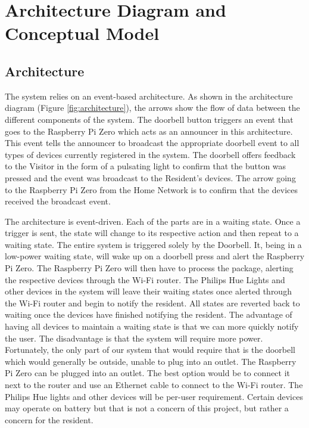 \chapter{Architecture Diagram and Conceptual Model}

\section{Architecture}
The system relies on an event-based architecture. As shown in the architecture diagram (Figure \ref{fig:architecture}), the arrows show the flow of data between the different components of the system. The doorbell button triggers an event that goes to the Raspberry Pi Zero which acts as an announcer in this architecture. This event tells the announcer to broadcast the appropriate doorbell event to all types of devices currently registered in the system. The doorbell offers feedback to the Visitor in the form of a pulsating light to confirm that the button was pressed and the event was broadcast to the Resident's devices. The arrow going to the Raspberry Pi Zero from the Home Network is to confirm that the devices received the broadcast event.

The architecture is event-driven. Each of the parts are in a waiting state. Once a trigger is sent, the state will change to its respective action and then repeat to a waiting state. The entire system is triggered solely by the Doorbell. It, being in a low-power waiting state, will wake up on a doorbell press and alert the Raspberry Pi Zero. The Raspberry Pi Zero will then have to process the package, alerting the respective devices through the Wi-Fi router. The Philips Hue Lights and other devices in the system will leave their waiting states once alerted through the Wi-Fi router and begin to notify the resident. All states are reverted back to waiting once the devices have finished notifying the resident. The advantage of having all devices to maintain a waiting state is that we can more quickly notify the user. The disadvantage is that the system will require more power. Fortunately, the only part of our system that would require that is the doorbell which would generally be outside, unable to plug into an outlet. The Raspberry Pi Zero can be plugged into an outlet. The best option would be to connect it next to the router and use an Ethernet cable to connect to the Wi-Fi router. The Philips Hue lights and other devices will be per-user requirement. Certain devices may operate on battery but that is not a concern of this project, but rather a concern for the resident.

